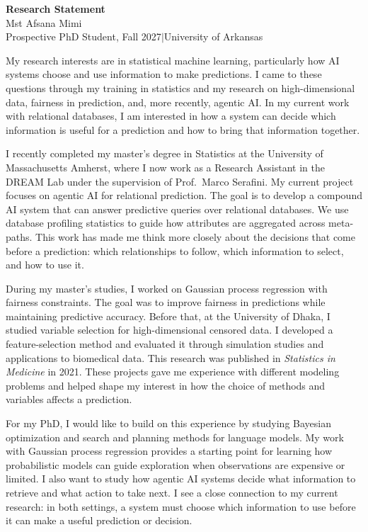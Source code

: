\documentclass[11pt,letterpaper]{article}
\begin{document}
\begin{center}
  {\Large\bfseries Research Statement}\\[6pt]
  {\large Mst Afsana Mimi}\\[4pt]
  {\small Prospective PhD Student, Fall 2027\enspace$\vert$\enspace University of Arkansas}
\end{center}
\vspace{2pt}

My research interests are in statistical machine learning, particularly how AI systems choose and use information to make predictions. I came to these questions through my training in statistics and my research on high-dimensional data, fairness in prediction, and, more recently, agentic AI. In my current work with relational databases, I am interested in how a system can decide which information is useful for a prediction and how to bring that information together.

I recently completed my master's degree in Statistics at the University of Massachusetts Amherst, where I now work as a Research Assistant in the DREAM Lab under the supervision of Prof.\ Marco Serafini. My current project focuses on agentic AI for relational prediction. The goal is to develop a compound AI system that can answer predictive queries over relational databases. We use database profiling statistics to guide how attributes are aggregated across meta-paths. This work has made me think more closely about the decisions that come before a prediction: which relationships to follow, which information to select, and how to use it.

During my master's studies, I worked on Gaussian process regression with fairness constraints. The goal was to improve fairness in predictions while maintaining predictive accuracy. Before that, at the University of Dhaka, I studied variable selection for high-dimensional censored data. I developed a feature-selection method and evaluated it through simulation studies and applications to biomedical data. This research was published in \emph{Statistics in Medicine} in 2021. These projects gave me experience with different modeling problems and helped shape my interest in how the choice of methods and variables affects a prediction.

For my PhD, I would like to build on this experience by studying Bayesian optimization and search and planning methods for language models. My work with Gaussian process regression provides a starting point for learning how probabilistic models can guide exploration when observations are expensive or limited. I also want to study how agentic AI systems decide what information to retrieve and what action to take next. I see a close connection to my current research: in both settings, a system must choose which information to use before it can make a useful prediction or decision.
\end{document}
